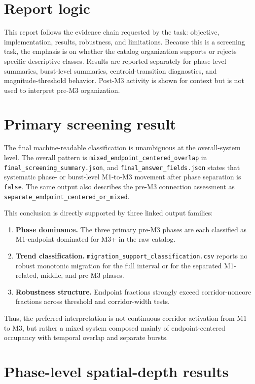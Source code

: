 \documentclass[11pt]{article}
\begin{document}
\section{Report logic}
This report follows the evidence chain requested by the task: objective, implementation, results, robustness, and limitations. Because this is a screening task, the emphasis is on whether the catalog organization supports or rejects specific descriptive classes. Results are reported separately for phase-level summaries, burst-level summaries, centroid-transition diagnostics, and magnitude-threshold behavior. Post-M3 activity is shown for context but is not used to interpret pre-M3 organization.

\section{Primary screening result}
The final machine-readable classification is unambiguous at the overall-system level. The overall pattern is \texttt{mixed\_endpoint\_centered\_overlap} in \texttt{final\_screening\_summary.json}, and \texttt{final\_answer\_fields.json} states that systematic phase- or burst-level M1-to-M3 movement after phase separation is \texttt{false}. The same output also describes the pre-M3 connection assessment as \texttt{separate\_endpoint\_centered\_or\_mixed}.

This conclusion is directly supported by three linked output families:
\begin{enumerate}[leftmargin=1.5em]
    \item \textbf{Phase dominance.} The three primary pre-M3 phases are each classified as M1-endpoint dominated for M3+ in the raw catalog.
    \item \textbf{Trend classification.} \texttt{migration\_support\_classification.csv} reports no robust monotonic migration for the full interval or for the separated M1-related, middle, and pre-M3 phases.
    \item \textbf{Robustness structure.} Endpoint fractions strongly exceed corridor-noncore fractions across threshold and corridor-width tests.
\end{enumerate}

Thus, the preferred interpretation is not continuous corridor activation from M1 to M3, but rather a mixed system composed mainly of endpoint-centered occupancy with temporal overlap and separate bursts.

\section{Phase-level spatial-depth results}
\end{document}
